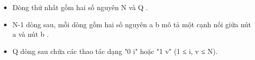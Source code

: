 \begin{itemize}
	\item Dòng thứ nhất gồm hai số nguyên N và Q .
	\item N-1 dòng sau, mỗi dòng gồm hai số nguyên a b mô tả một cạnh nối giữa nút a và nút b .
	\item Q dòng sau chứa các thao tác dạng "0 i" hoặc "1 v" (1 ≤ i, v ≤ N).
\end{itemize}
